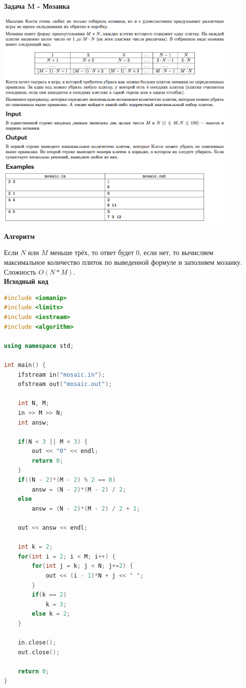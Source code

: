 \documentclass[a4paper,12pt]{article}
\begin{document}
\newpage
\textbf{{\large Задача M - Мозаика}}

\begin{center}
\includegraphics[width=0.9\textwidth]{OC_Northern/OC_Northern_M.png}\\ [1cm]
\end{center}
\newpage

\textbf{{\large Алгоритм}}

Если $N$ или $M$ меньше трёх, то ответ будет $0$, если нет, то вычисляем максимальное количество плиток по выведенной формуле и заполняем мозаику. Сложность $O(N*M)$. \\

\textbf{{\large Исходный код}} \\
\begin{lstlisting}[language=C++]
#include <iomanip>
#include <limits>
#include <iostream>
#include <algorithm>

using namespace std;

int main() {
    ifstream in("mosaic.in");
    ofstream out("mosaic.out");

	int N, M;
	in >> M >> N;
	int answ;

	if(N < 3 || M < 3) {
		out << "0" << endl;
		return 0;
	}
	if((N - 2)*(M - 2) % 2 == 0)
		answ = (N - 2)*(M - 2) / 2;
	else
		answ = (N - 2)*(M - 2) / 2 + 1;

	out << answ << endl;

	int k = 2;
	for(int i = 2; i < M; i++) {
		for(int j = k; j < N; j+=2) {
			out << (i - 1)*N + j << " ";
		}
		if(k == 2)
			k = 3;
		else k = 2;
	}

    in.close();
    out.close();

    return 0;
}
\end{lstlisting}
\end{document}
